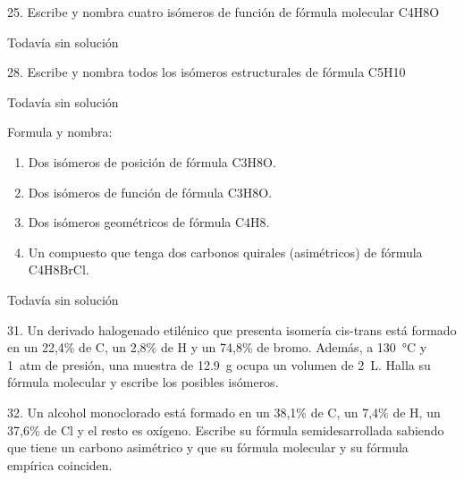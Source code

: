 \documentclass{article}
\begin{document}
\begin{exercise}
  25. Escribe y nombra cuatro isómeros de función de fórmula molecular C4H8O
\end{exercise}

\begin{solution}[print=false]
  Todavía sin solución
\end{solution}

\begin{exercise}
  28. Escribe y nombra todos los isómeros estructurales de fórmula C5H10
\end{exercise}

\begin{solution}[print=false]
  Todavía sin solución
\end{solution}

\begin{exercise}
  Formula y nombra:
  \begin{enumerate}
    \item Dos isómeros de posición de fórmula C3H8O.
    \item Dos isómeros de función de fórmula C3H8O.
    \item Dos isómeros geométricos de fórmula C4H8.
    \item Un compuesto que tenga dos carbonos quirales (asimétricos) de fórmula C4H8BrCl.
  \end{enumerate}
\end{exercise}

\begin{solution}[print=false]
  Todavía sin solución
\end{solution}

\begin{exercise}
  31. Un derivado halogenado etilénico que presenta isomería cis-trans
  está formado en un 22,4\% de C, un 2,8\% de H y un
  74,8\% de bromo. Además, a \SI{130}{\celsius} y \SI{1}{atm} de presión, una
  muestra de \SI{12,9}{\gram} ocupa un volumen de \SI{2}{\liter}. Halla su fórmula
  molecular y escribe los posibles isómeros.
\end{exercise}

\begin{solution}[print=false]
\end{solution}

\begin{exercise}
  32. Un alcohol monoclorado está formado en un 38,1\% de C,
  un 7,4\% de H, un 37,6\% de Cl y el resto es oxígeno. Escribe
  su fórmula semidesarrollada sabiendo que tiene un carbono
  asimétrico y que su fórmula molecular y su fórmula empírica
  coinciden.
\end{exercise}
\end{document}
